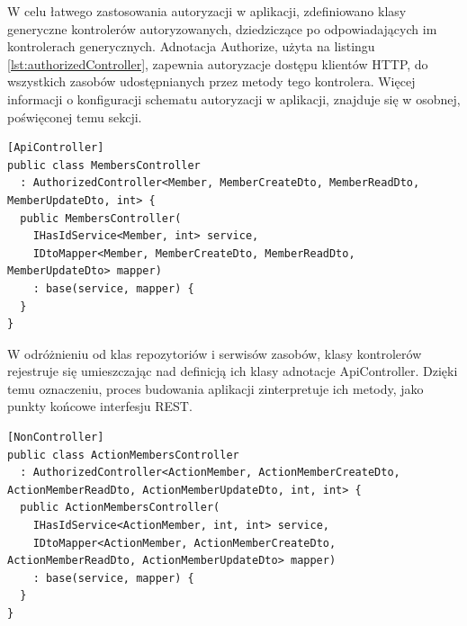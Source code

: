 W celu łatwego zastosowania autoryzacji w aplikacji, zdefiniowano klasy generyczne kontrolerów autoryzowanych, dziedziczące po odpowiadających im kontrolerach generycznych. Adnotacja Authorize, użyta na listingu \ref{lst:authorizedController}, zapewnia autoryzacje dostępu klientów HTTP, do wszystkich zasobów udostępnianych przez metody tego kontrolera. Więcej informacji o konfiguracji schematu autoryzacji w aplikacji, znajduje się w osobnej, poświęconej temu sekcji.

\begin{lstlisting}[language=CSharp, caption={Przykładowa klasa konkretna kontrolera, udostępniająca zasoby REST}, label=lst:membersController]
[ApiController]
public class MembersController
  : AuthorizedController<Member, MemberCreateDto, MemberReadDto, MemberUpdateDto, int> {
  public MembersController(
    IHasIdService<Member, int> service,
    IDtoMapper<Member, MemberCreateDto, MemberReadDto, MemberUpdateDto> mapper)
    : base(service, mapper) {
  }
}
\end{lstlisting}

W odróżnieniu od klas repozytoriów i serwisów zasobów, klasy kontrolerów rejestruje się umieszczając nad definicją ich klasy adnotacje ApiController. Dzięki temu oznaczeniu, proces budowania aplikacji zinterpretuje ich metody, jako punkty końcowe interfesju REST.

\begin{lstlisting}[language=CSharp, caption={Przykładowa klasa konkretna, której odebrano funkcjonalności kontrolera}, label=lst:actionMembersController]
[NonController]
public class ActionMembersController
  : AuthorizedController<ActionMember, ActionMemberCreateDto, ActionMemberReadDto, ActionMemberUpdateDto, int, int> {
  public ActionMembersController(
    IHasIdService<ActionMember, int, int> service,
    IDtoMapper<ActionMember, ActionMemberCreateDto, ActionMemberReadDto, ActionMemberUpdateDto> mapper)
    : base(service, mapper) {
  }
}
\end{lstlisting}

